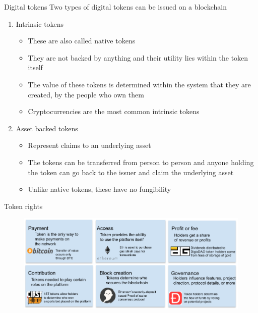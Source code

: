 \documentclass[10pt]{beamer}
\begin{document}

\begin{frame}{Digital tokens}
	Two types of digital tokens can be issued on a blockchain
	\begin{enumerate}
		\item Intrinsic tokens
			\begin{itemize}
				\item These are also called native tokens
				\item They are not backed by anything and their utility lies within the token itself
				\item The value of these tokens is determined within the system that they are created, by the people who own them
				\item Cryptocurrencies are the most common intrinsic tokens
			\end{itemize}
		\item Asset backed tokens
			\begin{itemize}
				\item Represent claims to an underlying asset
				\item The tokens can be transferred from person to person and anyone holding the token can go back to the issuer and claim the underlying asset
				\item Unlike native tokens, these have no fungibility
			\end{itemize}
	\end{enumerate}
\end{frame}


\begin{frame}{Token rights}
	\begin{figure}[]
		\centering
		\includegraphics  [scale=0.35]{Images/token-rights}
	\end{figure}
\end{frame}
\end{document}
